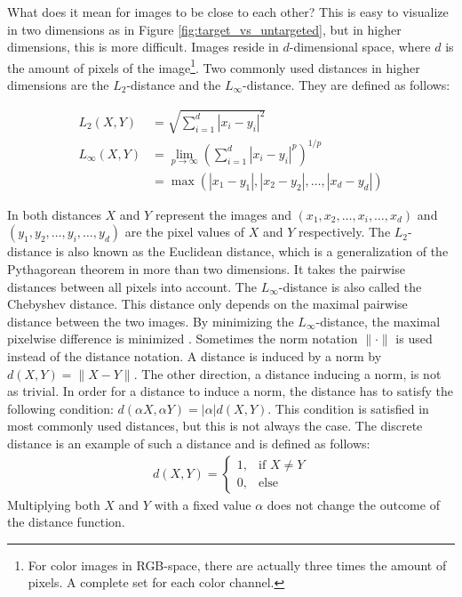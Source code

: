 What does it mean for images to be close to each other? This is easy to visualize in two dimensions as in Figure \ref{fig:target_vs_untargeted}, but in higher dimensions, this is more difficult. Images reside in $d$-dimensional space, where $d$ is the amount of pixels of the image\footnote{For color images in RGB-space, there are actually three times the amount of pixels. A complete set for each color channel.}. Two commonly used distances in higher dimensions are the $L_2$-distance and the $L_\infty$-distance. They are defined as follows:

\begin{align*}
L_2(X, Y) &= \sqrt{\sum_{i=1}^d|x_i - y_i|^2} \\
L_\infty(X, Y) &= \lim_{p\rightarrow \infty}\left( \sum_{i=1}^d|x_i-y_i|^p\right)^{1/p} \\
&= \max (|x_1 - y_1|, |x_2-y_2|, \ldots, |x_d-y_d|)
\end{align*}

In both distances $X$ and $Y$ represent the images and $(x_1, x_2, \ldots, x_i, \ldots, x_d)$ and $(y_1, y_2, \ldots, y_i, \ldots, y_d)$ are the pixel values of $X$ and $Y$ respectively. The $L_2$-distance is also known as the Euclidean distance, which is a generalization of the Pythagorean theorem in more than two dimensions. It takes the pairwise distances between all pixels into account. The $L_\infty$-distance is also called the Chebyshev distance. This distance only depends on the maximal pairwise distance between the two images. By minimizing the $L_\infty$-distance, the maximal pixelwise difference is minimized \cite{wiki_distances}.  Sometimes the norm notation $\| \cdot \|$ is used instead of the distance notation. A distance is induced by a norm by $d(X,Y) = \| X -Y\|$. The other direction, a distance inducing a norm, is not as trivial. In order for a distance to induce a norm, the distance has to satisfy the following condition: $d(\alpha X,\alpha Y) = |\alpha | d(X,Y)$. This condition is satisfied in most commonly used distances, but this is not always the case. The discrete distance \cite{discrete_distance} is an example of such a distance and is defined as follows:
\begin{align*}
d(X,Y) = 
\begin{cases}
1, &\text{if } X \neq Y\\
0, &\text{else}
\end{cases}
\end{align*}
Multiplying both $X$ and $Y$ with a fixed value $\alpha$ does not change the outcome of the distance function.\\

